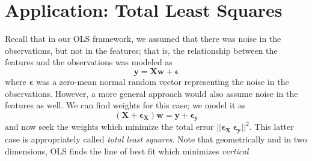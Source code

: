\documentclass{article}
\begin{document}
\section*{Application: Total Least Squares}
Recall that in our OLS framework, we assumed that there was noise in the observations, but not in the features; that is, the relationship between the features and the observations was modeled as $$\mathbf{y = Xw + \epsilon}$$ where $\mathbf{\epsilon}$ was a zero-mean normal random vector representing the noise in the observations. However, a more general approach would also assume noise in the features as well. We can find weights for this case; we model it as $$\mathbf{(X + \epsilon_X)w = y + \epsilon_y}$$ and now seek the weights which minimize the total error $||\mathbf{\epsilon_X\ \epsilon_y}||^2$. This latter case is appropriately called \textit{total least squares}. Note that geometrically and in two dimensions, OLS finds the line of best fit which minimizes \textit{vertical} 
\end{document}
